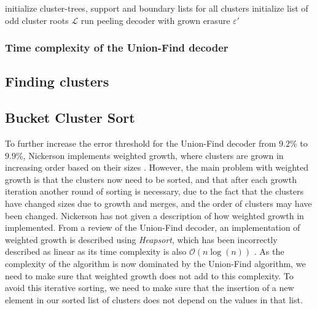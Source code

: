 \begin{algo}[algotitle=Union-Find decoder \cite{nickerson2017}, label=algo:uf]
\begin{algorithm}[H]
    \SetAlgoNoEnd
    \BlankLine
    initialize cluster-trees, support and boundary lists for all clusters \;
    initialize list of odd cluster roots $\mathcal{L}$\;
    run peeling decoder with grown erasure $\varepsilon'$
\end{algorithm}
\end{algo}

\subsubsection{Time complexity of the Union-Find decoder}

\subsection{Finding clusters}

\subsection{Bucket Cluster Sort}
To further increase the error threshold for the Union-Find decoder from $9.2\%$ to $9.9\%$, Nickerson implements weighted growth, where clusters are grown in increasing order based on their sizes \cite{delfosse2017}. However, the main problem with weighted growth is that the clusters now need to be sorted, and that after each growth iteration another round of sorting is necessary, due to the fact that the clusters have changed sizes due to growth and merges, and the order of clusters may have been changed. Nickerson has not given a description of how weighted growth in implemented. From a review of the Union-Find decoder, an implementation of weighted growth is described using \emph{Heapsort}, which has been incorrectly described as linear as its time complexity is also $\mathcal{O}(n\log(n))$ \cite{nando}. As the complexity of the algorithm is now dominated by the Union-Find algorithm, we need to make sure that weighted growth does not add to this complexity. To avoid this iterative sorting, we need to make sure that the insertion of a new element in our sorted list of clusters does not depend on the values in that list.

